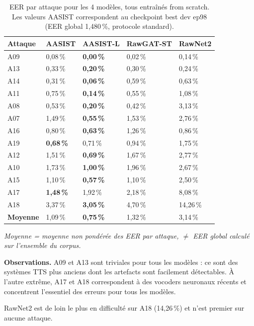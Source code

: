 \documentclass[10pt, a4paper]{article}
\begin{document}
\begin{table}[H]
\centering\small
\caption{EER par attaque pour les 4 modèles, tous entraînés from scratch. Les valeurs AASIST correspondent au checkpoint best dev ep98 (EER global 1,480\,\%, protocole standard).}
\begin{tabular}{@{}lllll@{}}
\toprule
Attaque & AASIST & AASIST-L & RawGAT-ST & RawNet2 \\
\midrule
A09 & 0,08\,\% & \textbf{0,00\,\%} & 0,02\,\% & 0,14\,\% \\
A13 & 0,33\,\% & \textbf{0,20\,\%} & 0,30\,\% & 0,24\,\% \\
A14 & 0,31\,\% & \textbf{0,06\,\%} & 0,59\,\% & 0,63\,\% \\
A11 & 0,75\,\% & \textbf{0,14\,\%} & 0,55\,\% & 1,08\,\% \\
A08 & 0,53\,\% & \textbf{0,20\,\%} & 0,42\,\% & 3,13\,\% \\
A07 & 1,49\,\% & \textbf{0,55\,\%} & 1,53\,\% & 2,76\,\% \\
A16 & 0,80\,\% & \textbf{0,63\,\%} & 1,26\,\% & 0,86\,\% \\
A19 & \textbf{0,68\,\%} & 0,71\,\% & 0,94\,\% & 1,75\,\% \\
A12 & 1,51\,\% & \textbf{0,69\,\%} & 1,67\,\% & 2,77\,\% \\
A10 & 1,73\,\% & \textbf{1,00\,\%} & 1,96\,\% & 2,67\,\% \\
A15 & 1,10\,\% & \textbf{0,57\,\%} & 1,10\,\% & 2,50\,\% \\
A17 & \textbf{1,48\,\%} & 1,92\,\% & 2,18\,\% & 8,08\,\% \\
A18 & 3,37\,\% & \textbf{3,05\,\%} & 4,70\,\% & 14,26\,\% \\
\midrule
\textbf{Moyenne} & 1,09\,\% & \textbf{0,75\,\%} & 1,32\,\% & 3,14\,\% \\
\bottomrule
\end{tabular}
\end{table}

\noindent\textit{Moyenne = moyenne non pondérée des EER par attaque, $\neq$ EER global calculé sur l'ensemble du corpus.}

\medskip
\noindent\textbf{Observations.} A09 et A13 sont triviales pour tous les modèles : ce sont des systèmes TTS plus anciens dont les artefacts sont facilement détectables. À l'autre extrême, A17 et A18 correspondent à des vocoders neuronaux récents et concentrent l'essentiel des erreurs pour tous les modèles.

RawNet2 est de loin le plus en difficulté sur A18 (14,26\,\%) et n'est premier sur aucune attaque.
\end{document}
